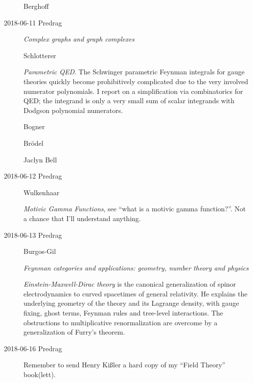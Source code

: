 \begin{description}
Berghoff

\item[2018-06-11 Predrag]

 {\em Complex graphs and graph complexes}

Schlotterer

{\em Parametric QED}.
The Schwinger parametric Feynman integrals for gauge theories quickly
become prohibitively complicated due to the very involved numerator
polynomials. I report on a simplification via combinatorics for QED; the
integrand is only a very small sum of scalar integrands with Dodgson
polynomial numerators.

Bogner

Br\"odel

Jaclyn Bell

\item[2018-06-12 Predrag]

Wulkenhaar

{\em Motivic Gamma Functions}, see ``what is a
{motivic gamma function?}''. Not a chance that I'll understand anything.

\item[2018-06-13 Predrag]

Burgos-Gil

 {\em Feynman categories and applications: geometry, number theory and physics}

 {\em Einstein-Maxwell-Dirac theory} is the canonical
generalization of spinor electrodynamics to curved spacetimes of general
relativity. He explains the underlying geometry of the theory and its
Lagrange density, with gauge fixing, ghost terms, Feynman rules and
tree-level interactions. The obstructions to multiplicative
renormalization are overcome by a generalization of Furry's theorem.


\item[2018-06-16 Predrag]
Remember to send Henry Ki{\ss}ler a hard copy of my ``Field Theory'' book(lett).

\end{description}


\printbibliography[heading=subbibintoc,title={References}]
